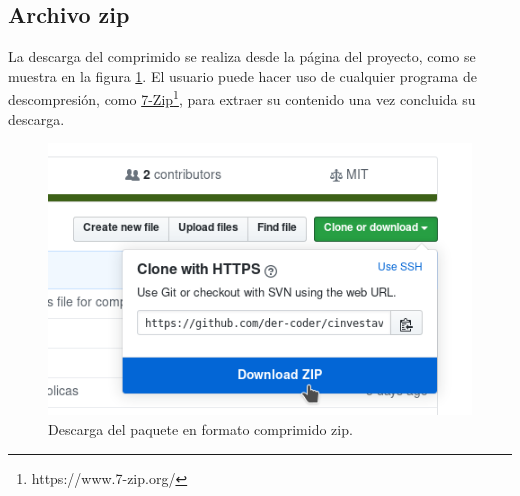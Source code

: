 \subsection{Archivo zip}
La descarga del comprimido se realiza desde la página del proyecto, como se muestra 
en la figura \ref{fig: descarga zip}. El usuario puede hacer uso de cualquier programa 
de descompresión, como \href{https://www.7-zip.org/}{7-Zip}\footnote{https://www.7-zip.org/}, 
para extraer su contenido una vez concluida su descarga.

\begin{figure}[h]
 \centering
 \includegraphics{img/install_github_download_zip.png}
 \caption{Descarga del paquete en formato comprimido zip.}
 \label{fig: descarga zip}
\end{figure}

% 
% 
% 
% 
% 
% 

